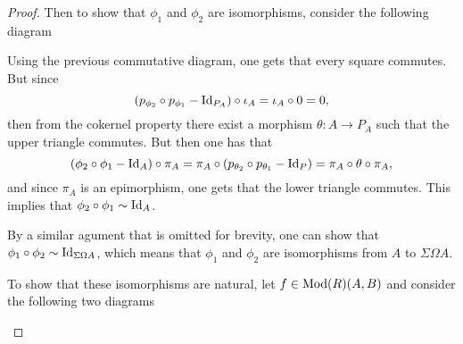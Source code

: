\begin{proof}
    Then to show that \( \phi_1 \) and \( \phi_2 \) are isomorphisms, consider the following diagram
    \begin{center}
    \end{center}

    Using the previous commutative diagram, one gets that every square commutes. But since
    \[
        (p_{\phi_2} \circ p_{\phi_1} - \operatorname{Id}_{P_A}) \circ \iota_A = \iota_A \circ 0 = 0,
    \]
    then from the cokernel property there exist a morphism \( \theta: A \to P_A \) such that the upper triangle commutes. But then one has that
    \[
        (\phi_2 \circ \phi_1 - \operatorname{Id}_A) \circ \pi_A = \pi_A \circ (p_{\theta_2} \circ p_{\theta_1} - \operatorname{Id}_P) = \pi_A \circ \theta \circ \pi_A,
    \]
    and since \( \pi_A \) is an epimorphism, one gets that the lower triangle commutes. This implies that \( \phi_2 \circ \phi_1 \sim \operatorname{Id}_A \).
    
    By a similar agument that is omitted for brevity, one can show that \( \phi_1 \circ \phi_2 \sim \operatorname{Id}_{\Sigma\Omega A} \), which means that \( \phi_1 \) and \( \phi_2 \) are isomorphisms from \( A \) to \( \Sigma\Omega A \).

    To show that these isomorphisms are natural, let \( f \in \operatorname{Mod}(R)(A, B) \) and consider the following two diagrams
    \begin{center}
\end{center}
\end{proof}

